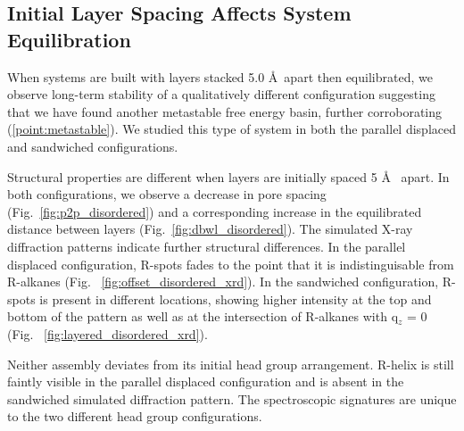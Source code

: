 \documentclass{article}
\newcommand{\angstrom}{\textup{\AA}}
\begin{document}
  \subsection{Initial Layer Spacing Affects System Equilibration}

  When systems are built with layers stacked 5.0 \AA~apart then
  equilibrated, we observe long-term stability of a qualitatively different
  configuration suggesting that we have found another metastable free energy
  basin, further corroborating (\ref{point:metastable}). We studied this type of
  system in both the parallel displaced and sandwiched configurations. 

  Structural properties are different when layers are initially spaced 5 \AA~
  apart. In both configurations, we observe a decrease in pore spacing
  (Fig.~\ref{fig:p2p_disordered}) and a corresponding increase in the equilibrated
  distance between layers (Fig.~\ref{fig:dbwl_disordered}). The simulated X-ray
  diffraction patterns indicate further structural differences. In the parallel
  displaced configuration, R-spots fades to the point that it is indistinguisable
  from R-alkanes (Fig. ~\ref{fig:offset_disordered_xrd}). In the sandwiched
  configuration, R-spots is present in different locations, showing higher
  intensity at the top and bottom of the pattern as well as at the intersection
  of R-alkanes with q$_z$ = 0 (Fig. ~\ref{fig:layered_disordered_xrd}). 

  Neither assembly deviates from its initial head group arrangement. R-helix is still 
  faintly visible in the parallel displaced configuration and is absent in the 
  sandwiched simulated diffraction pattern. The spectroscopic signatures are unique to
  the two different head group configurations.
\end{document}
